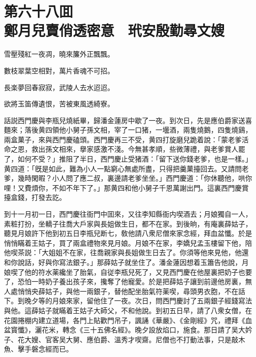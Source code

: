 
\chapter*{第六十八囬　\\鄭月兒賣俏透密意　玳安殷勤尋文嫂}


\begin{myquote}
雪壓殘紅一夜凋，曉來簾外正飄飄。

數枝翠葉空相對，萬片香魂不可招。

長楽夢回春寂寂，武陵人去水迢迢。

欲將玉笛傳遺恨，苦被東風透綺寮。
\end{myquote}

話説西門慶與李瓶兒燒紙畢，歸潘金蓮房中歇了一夜。到次日，先是應伯爵家送喜麵來；落後黄四領他小舅子孫文相，宰了一口猪，一壜酒，兩隻燒鵝，四隻燒鷄，兩盒菓子，來與西門慶磕頭。西門慶再三不受，黄四打旋磨兒跪着說：「蒙老爹活命之恩，救出孫文相來，擧家感激不淺。今無甚孝順，些微薄禮，與老爹賞人罷了，如何不受？」推阻了半日，西門慶止受猪酒：「留下送你錢老爹，也是一樣。」黄四道：「旣是如此，難為小人一點窮心無處所盡，只得把羹菓擡回去。又請問老爹，幾時閑暇？小人問了應二叔，裏邊請老爹坐坐。」西門慶道：「你休聽他，哄你哩！又費煩你，不如不年下了。」那黄四和他小舅子千恩萬謝出門。這裏西門慶賞擡盒錢，打發去訖。

到十一月初一日，西門慶往衙門中囬來，又往李知縣衙内喫酒去；月娘獨自一人，素粧打扮，坐轎子往喬大戶家與長姐做生日，都不在家。到後晌，有庵裏薛姑子，聽見月娘許下他到初五日李瓶兒断七，敎他請八衆尼僧來家念經，拜血盆懺。於是悄悄瞞着王姑子，買了兩盒禮物來見月娘。月娘不在家，李嬌兒孟玉樓留下他，陪他喫茶説：「大姐姐不在家，往喬親家與長姐做生日去了。你須等他來見他，他還和你說話，好與你寫法銀子。」那薛姑子就坐住了。潘金蓮因想着玉簫告他說，月娘喫了他的符水薬纔坐了胎氣，自従李瓶兒死了，又見西門慶在他屋裏把奶子也要了，恐怕一時奶子養出孩子來，攙奪了他寵愛。於是把薛姑子讓到前邊他房裏，無人處悄悄央薛姑子，與他一兩銀子，替他配坐胎氣符薬喫，尋頭男衣胞，不在話下。到晚夕等的月娘來家，留他住了一夜。次日，問西門慶討了五兩銀子經錢寫法與他。這薛姑子就瞞着王姑子大師父，不和他說。到初五日早，請了八衆女僧，在花園捲棚内建立道場，各門上貼歡門吊子，諷誦《華嚴》、《金剛經》咒，禮拜《血盆寳懺》，灑花米，轉念《三十五佛名經》。晚夕設放焰口，施食。那日請了吴大妗子、花大嫂、官客吴大舅、應伯爵、溫秀才喫齋。尼僧也不打動法事，只是敲木魚、擊手磐念經而已。

